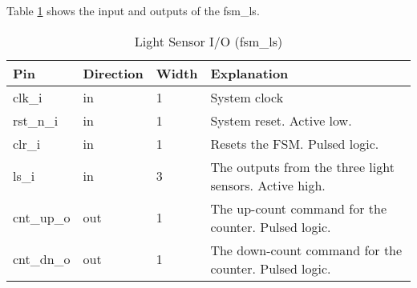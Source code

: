 
Table \ref{tab:asPer01} shows the input and outputs of the fsm\_ls.
\begin{table}[H]
\centering
\begin{tabularx}{\textwidth}{|l |l |l |X|}
  \hline
  Pin & Direction & Width & Explanation \\
  \hline
  \hline
  clk\_i & in & 1 & System clock \\
  \hline
  rst\_n\_i & in & 1 & System reset. Active low. \\
  \hline
  clr\_i & in & 1 & Resets the FSM. Pulsed logic. \\
  \hline
  ls\_i & in & 3 &  The outputs from the three light sensors. Active high. \\
  \hline
  cnt\_up\_o & out & 1 &  The up-count command for the counter. Pulsed logic. \\
  \hline
  cnt\_dn\_o & out & 1 &  The down-count command for the counter. Pulsed logic. \\
  \hline
\end{tabularx}
\caption{Light Sensor I/O (fsm\_ls)}
\label{tab:asPer01}
\end{table}
